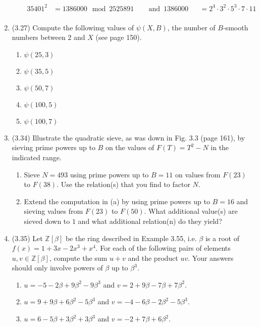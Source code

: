 \documentclass[12pt]{amsart}
\theoremstyle{definition}
\begin{document}
\begin{enumerate}
\begin{enumerate}
\begin{alignat*}{3}
				5401^2 & = 1386000 \mod 2525891~ && \operatorname{and}~
				1386000 && = 2^4 \cdot 3^2 \cdot 5^3 \cdot 7 \cdot 11 \\
			\end{alignat*}
		\end{enumerate}
	\item (3.27) Compute the followimg values of $\psi(X,B)$, the number of $B$-smooth 
		numbers between $2$ and $X$ (see page 150).
		\begin{enumerate}
			\item $\psi(25,3)$
			\item $\psi(35,5)$
			\item $\psi(50,7)$
			\item $\psi(100,5)$
			\item $\psi(100,7)$
		\end{enumerate}

	\item (3.34) Illustrate the quadratic sieve, as was down in Fig. 3.3 (page 161), 
		by sieving prime powers up to $B$ on the values of $F(T) = T^2 - N$ in 
		the indicated range.
		\begin{enumerate}
			\item Sieve $N=493$ using prime powers up to $B=11$ on values 
				from $F(23)$ to $F(38)$. Use the relation(s) that you 
				find to factor $N$. 
			\item Extend the computation in (a) by using prime powers up 
				to $B=16$ and sieving values from $F(23)$ to $F(50)$. 
				What additional value(s) are sieved down to $1$ and 
				what additional relation(n) do they yield? 
		\end{enumerate}
			
	\item (3.35) Let $\mathbb{Z}[\beta]$ be the ring described in Example 3.55, i.e. 
		$\beta$ is a root of $f(x) = 1 + 3x - 2x^3 + x^4$. For each of the 
		following pairs of elements $u,v \in \mathbb{Z}[\beta]$, compute 
		the sum $u + v$ and the product $uv$. Your answers should only involve 
		powers of $\beta$ up to $\beta^3$. 
		\begin{enumerate}
			\item $u = -5-2\beta+9\beta^2-9\beta^3$ and $v=2+9\beta-7
				\beta + 7 \beta^2$.
			\item $u = 9 + 9\beta + 6\beta^2 - 5\beta^3$ and $v = -4 
				- 6\beta - 2\beta^2 -5 \beta^3$.
			\item $u = 6 - 5\beta + 3\beta^2 + 3 \beta^3$ and $v = -2 
				+ 7\beta + 6\beta^2$. 
		\end{enumerate}
			
\end{enumerate}
\end{document}
